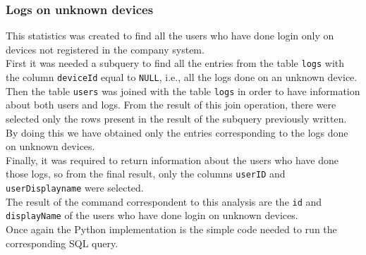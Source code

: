 \documentclass[12pt, a4paper, oneside]{article}
\begin{document}
\subsubsection{Logs on unknown devices}
\label{subsubsec:unknown}
This statistics was created to find all the users who have done login only on devices not registered in the company system.\\
First it was needed a subquery to find all the entries from the table \texttt{logs} with the column \texttt{deviceId} equal to \texttt{NULL}, i.e., all the logs done on an unknown device.\\
Then the table \texttt{users} was joined with the table \texttt{logs} in order to have information about both users and logs. From the result of this join operation, there were selected only the rows present
in the result of the subquery previously written. By doing this we have obtained only the entries corresponding to the logs done on unknown devices.\\
Finally, it was required to return information about the users who have done those logs, so from the final result, only the columns \texttt{userID} and \texttt{userDisplayname} were selected.\\
The result of the command correspondent to this analysis are the \texttt{id} and \texttt{displayName} of the users who have done login on unknown devices.\\
Once again the Python implementation is the simple code needed to run the corresponding SQL query.
\end{document}
